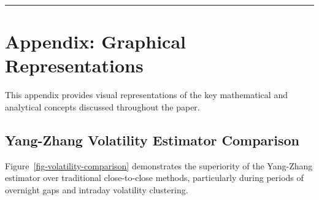 \documentclass[
  american,
  11pt,
  11pt,
  letterpaper,
  onecolumn]{article}
\begin{document}
\begin{center}\rule{0.5\linewidth}{0.5pt}\end{center}

\section{Appendix: Graphical
Representations}\label{appendix-graphical-representations}

This appendix provides visual representations of the key mathematical
and analytical concepts discussed throughout the paper.

\subsection{Yang-Zhang Volatility Estimator
Comparison}\label{yang-zhang-volatility-estimator-comparison}

Figure~\ref{fig-volatility-comparison} demonstrates the superiority of
the Yang-Zhang estimator over traditional close-to-close methods,
particularly during periods of overnight gaps and intraday volatility
clustering.
\end{document}
